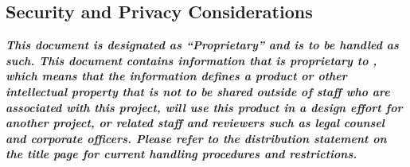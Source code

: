 \subsection{Security and Privacy Considerations}

{\bf \em This document is designated as ``\OurCorporateName Proprietary'' and is to be handled as such.
This document contains information that is proprietary to \OurCorporateName, which means that the information defines a product or other intellectual property that is not to be shared outside of \OurCorporateName staff who are associated with this project, will use this product in a design effort for another project, or related staff and reviewers such as legal counsel and corporate officers.
Please refer to the distribution statement on the title page for current handling procedures and restrictions.}